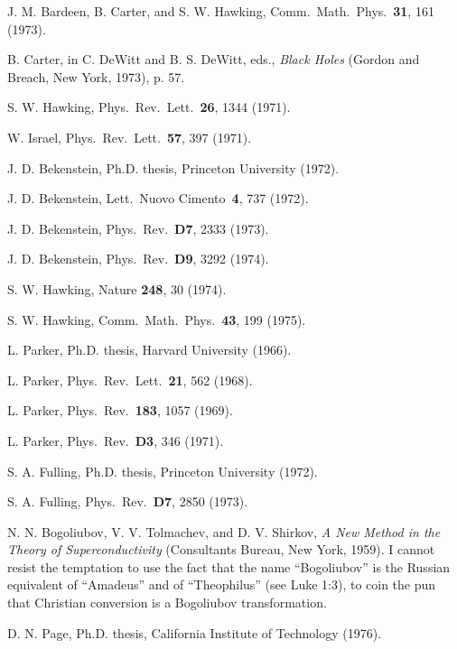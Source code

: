 \documentclass[12pt]{article} \usepackage{latexsym} \textwidth 15cm
\begin{document}
\baselineskip 4pt

\begin{thebibliography}{99}


 J. M. Bardeen, B. Carter, and S. W. Hawking, Comm.\
  Math.\ Phys.\ {\bf 31}, 161 (1973).

 B. Carter, in C. DeWitt and B. S. DeWitt, eds.,
  \emph{Black Holes} (Gordon and Breach, New York, 1973), p. 57.

 S. W. Hawking, Phys.\ Rev.\ Lett.\ {\bf 26},
  1344 (1971).

 W. Israel,  Phys.\ Rev.\ Lett.\ {\bf 57}, 397 (1971).

 J. D. Bekenstein, Ph.D. thesis, Princeton University
  (1972).

 J. D. Bekenstein, Lett.\ Nuovo Cimento\ {\bf 4}, 737
  (1972).

 J. D. Bekenstein, Phys.\ Rev.\ {\bf D7}, 2333 (1973).

 J. D. Bekenstein, Phys.\ Rev.\ {\bf D9}, 3292 (1974).

 S. W. Hawking, Nature {\bf 248}, 30 (1974).

 S. W. Hawking, Comm.\ Math.\ Phys.\ {\bf 43}, 199
  (1975).
  
 L. Parker, Ph.D. thesis, Harvard University (1966).

 L. Parker, Phys.\ Rev.\ Lett.\ {\bf 21}, 562 (1968).

 L. Parker, Phys.\ Rev.\ {\bf 183}, 1057 (1969).

 L. Parker, Phys.\ Rev.\ {\bf D3}, 346 (1971).

 S. A. Fulling, Ph.D. thesis, Princeton University
(1972).

 S. A. Fulling, Phys.\ Rev.\ {\bf D7}, 2850 (1973).

 N. N. Bogoliubov, V. V. Tolmachev, and D. V. Shirkov,
\emph{A New Method in the Theory of Superconductivity} (Consultants
Bureau, New York, 1959).  I cannot resist the temptation to use the
fact that the name ``Bogoliubov'' is the Russian equivalent of
``Amadeus'' and of ``Theophilus'' (see Luke 1:3), to coin the pun that
Christian conversion is a Bogoliubov transformation.

 D. N. Page, Ph.D. thesis, California Institute of
  Technology (1976).


\end{thebibliography}
\end{document}
